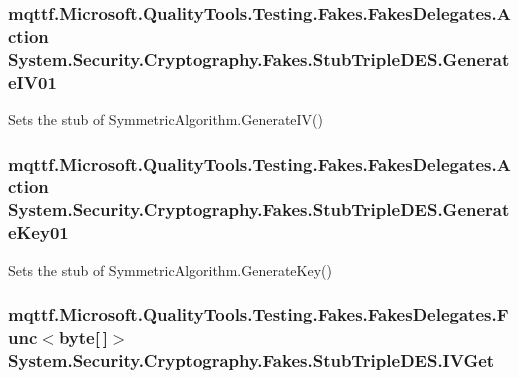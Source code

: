 \hypertarget{class_system_1_1_security_1_1_cryptography_1_1_fakes_1_1_stub_triple_d_e_s_a6ba5ad9b659a22f93ef9af86c9c01303}{
\subsubsection[{Generate\-I\-V01}]{\setlength{\rightskip}{0pt plus 5cm}mqttf.\-Microsoft.\-Quality\-Tools.\-Testing.\-Fakes.\-Fakes\-Delegates.\-Action System.\-Security.\-Cryptography.\-Fakes.\-Stub\-Triple\-D\-E\-S.\-Generate\-I\-V01}}\label{class_system_1_1_security_1_1_cryptography_1_1_fakes_1_1_stub_triple_d_e_s_a6ba5ad9b659a22f93ef9af86c9c01303}


Sets the stub of Symmetric\-Algorithm.\-Generate\-I\-V()

\hypertarget{class_system_1_1_security_1_1_cryptography_1_1_fakes_1_1_stub_triple_d_e_s_a551d997cc14c90cfc4dd309ad5a10aa8}{
\subsubsection[{Generate\-Key01}]{\setlength{\rightskip}{0pt plus 5cm}mqttf.\-Microsoft.\-Quality\-Tools.\-Testing.\-Fakes.\-Fakes\-Delegates.\-Action System.\-Security.\-Cryptography.\-Fakes.\-Stub\-Triple\-D\-E\-S.\-Generate\-Key01}}\label{class_system_1_1_security_1_1_cryptography_1_1_fakes_1_1_stub_triple_d_e_s_a551d997cc14c90cfc4dd309ad5a10aa8}


Sets the stub of Symmetric\-Algorithm.\-Generate\-Key()

\hypertarget{class_system_1_1_security_1_1_cryptography_1_1_fakes_1_1_stub_triple_d_e_s_a175416ef6cfab456063a773acfa306e4}{
\subsubsection[{I\-V\-Get}]{\setlength{\rightskip}{0pt plus 5cm}mqttf.\-Microsoft.\-Quality\-Tools.\-Testing.\-Fakes.\-Fakes\-Delegates.\-Func$<$byte\mbox{[}$\,$\mbox{]}$>$ System.\-Security.\-Cryptography.\-Fakes.\-Stub\-Triple\-D\-E\-S.\-I\-V\-Get}}\label{class_system_1_1_security_1_1_cryptography_1_1_fakes_1_1_stub_triple_d_e_s_a175416ef6cfab456063a773acfa306e4}


